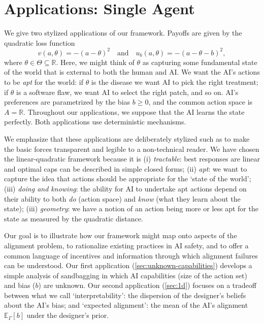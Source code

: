 \documentclass[12pt,reqno]{article}
\newcommand{\Ex}{\mathbb{E}}
\theoremstyle{definition} \newtheorem{example}{Example}
\theoremstyle{definition} \newtheorem{condition}{Condition}
\theoremstyle{definition} \newtheorem{corollary}{Corollary}
\theoremstyle{definition} \newtheorem{claim}{Claim}
\theoremstyle{definition} \newtheorem{definition}{Definition}
\theoremstyle{definition} \newtheorem{conjecture}{Conjecture}
\theoremstyle{definition} \newtheorem{Lemma}{Lemma}
\theoremstyle{definition} \newtheorem{lemma}{Lemma}
\theoremstyle{plain} \newtheorem{theorem}{Theorem}
\theoremstyle{definition} \newtheorem{assumption}{Assumption}
\theoremstyle{definition} \newtheorem*{assumptionnonumber}{Assumption}
\theoremstyle{definition} \newtheorem*{theoremNoNumber}{Proposition}
\theoremstyle{definition}\newtheorem{proposition}{Proposition}
\theoremstyle{definition} \newtheorem{observation}{Observation}
\theoremstyle{definition} \newtheorem*{definitionNoNumber}{Definition}
\theoremstyle{definition} \newtheorem{Definition}{Definition}
\theoremstyle{definition} \newtheorem*{DefinitionNoNumber}{Definition}
\theoremstyle{definition} \newtheorem*{fact}{Fact}
\theoremstyle{definition} \newtheorem*{property}{Property}
\theoremstyle{definition} \newtheorem{remark}{Remark}
\theoremstyle{definition}\newtheorem{romanexampleinner}{Example}
\begin{document}
\section{Applications: Single Agent}\label{sec:LQexamples}
We give two stylized applications of our framework. Payoffs are given by the quadratic loss function 
\[
v(a,\theta)=-(a-\theta)^2
\quad \text{and} \quad 
u_b(a,\theta)=-(a-\theta-b)^2,
\]
where $\theta\in\Theta\subseteq\mathbb R$. Here, we might think of $\theta$ as capturing some fundamental state of the world that is external to both the human and AI. We want the AI's actions to be \emph{apt} for the world: if $\theta$ is the disease we want AI to pick the right treatment; if $\theta$ is a software flaw, we want AI to select the right patch, and so on. AI's preferences are parametrized by the bias $b\geq0$, and the common action space is $A=\mathbb R$. Throughout our applications, we suppose that the AI learns the state perfectly. Both applications use deterministic mechanisms.

We emphasize that these applications are deliberately stylized such as to make the basic forces transparent and legible to a non-technical reader. We have chosen the linear-quadratic framework because it is (i) \emph{tractable}: best responses are linear and optimal caps can be described in simple closed forms; (ii) \emph{apt}: we want to capture the idea that actions should be appropriate for the `state of the world'; (iii) \emph{doing and knowing}: the ability for AI to undertake apt actions depend on their ability to both \emph{do} (action space) and \emph{know} (what they learn about the state); (iii) \emph{geometry}: we have a notion of an action being more or less apt for the state as measured by the quadratic distance. 

Our goal is to illustrate how our framework might map onto aspects of the alignment problem, to rationalize existing practices in AI safety, and to offer a common language of incentives and information through which alignment failures can be understood. Our first application (\cref{sec:unknown-capabilities}) develops a simple analysis of sandbagging in which AI capabilities (size of the action set) and bias ($b$) are unknown. Our second application (\cref{sec:1d}) focuses on a tradeoff between what we call `interpretability': the dispersion of the designer's beliefs about the AI's bias; and `expected alignment': the mean of the AI's alignment $\Ex_{\Gamma}[b]$ under the designer's prior.
\end{document}
